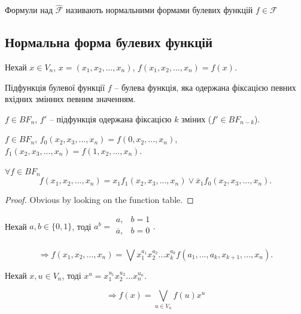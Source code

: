 Формули над $\hat{\mathcal{F}}$ називають нормальними формами булевих функцій $f \in \mathcal{F}$

\subsection{Нормальна форма булевих функцій}

Нехай $x \in V_n$, $x = (x_1, x_2, ..., x_n)$, $f(x_1, x_2, ..., x_n) = f(x)$.

Підфункція булевої функції $f$ -- булева функція, яка одержана фіксацією певних
вхідних змінних певним значенням.

$f \in BF_n$, $f'$ -- підфункція одержана фіксацією $k$ зміних ($f' \in BF_{n - k}$).

$f \in BF_n$, $f_0(x_2, x_3, ..., x_n) = f(0, x_2, ..., x_n)$, $f_1(x_2, x_3, ..., x_n) = f(1, x_2, ..., x_n)$.

\begin{theorem}
    $\forall f \in BF_n$
    \begin{equation*}
        f(x_1, x_2, ..., x_n) = x_1 f_1(x_2, x_3, ..., x_n) \vee \overline{x}_1 f_0(x_2, x_3, ..., x_n).
    \end{equation*}
\end{theorem}
\begin{proof}
    Obvious by looking on the function table.
\end{proof}

\begin{corollary}
    Нехай $a, b \in \{0, 1\}$, тоді $a^b = \begin{array}{cc}
        a, & b = 1 \\
        \overline{a}, & b = 0 \\
    \end{array}.$

    \begin{equation*}
        \Rightarrow f(x_1, x_2, ..., x_n) = \bigvee x_1^{a_1} x_2^{a_2} ... x_k^{a_k} f(a_1, ..., a_k, x_{k + 1}, ..., x_n).
    \end{equation*}
\end{corollary}

\begin{corollary}
    Нехай $x, u \in V_n$, тоді $x^u = x_1^{u_1} x_2^{u_2} ... x_n^{u_n}$.

    \begin{equation*}
        \Rightarrow f(x) = \bigvee_{u \in V_n} f(u) x^u
    \end{equation*}    
\end{corollary}

